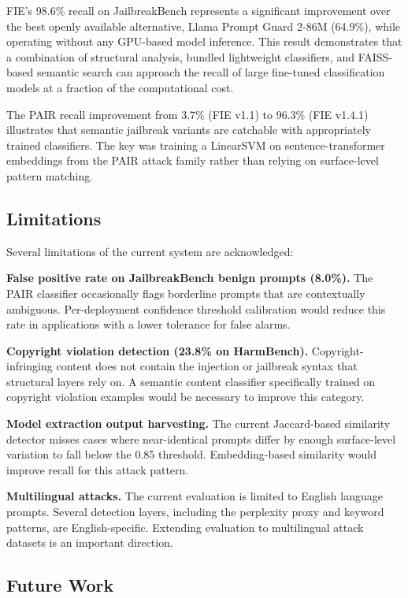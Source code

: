 \documentclass[preprint,12pt,authoryear]{elsarticle}
\begin{document}
FIE's 98.6\% recall on JailbreakBench represents a significant
improvement over the best openly available alternative, Llama Prompt
Guard 2-86M (64.9\%), while operating without any GPU-based model
inference. This result demonstrates that a combination of structural
analysis, bundled lightweight classifiers, and FAISS-based semantic
search can approach the recall of large fine-tuned classification
models at a fraction of the computational cost.

The PAIR recall improvement from 3.7\% (FIE v1.1) to 96.3\%
(FIE v1.4.1) illustrates that semantic jailbreak variants are
catchable with appropriately trained classifiers. The key was training
a LinearSVM on sentence-transformer embeddings from the PAIR attack
family rather than relying on surface-level pattern matching.

\subsection{Limitations}

Several limitations of the current system are acknowledged:

\textbf{False positive rate on JailbreakBench benign prompts (8.0\%).}
The PAIR classifier occasionally flags borderline prompts that are
contextually ambiguous. Per-deployment confidence threshold calibration
would reduce this rate in applications with a lower tolerance for
false alarms.

\textbf{Copyright violation detection (23.8\% on HarmBench).}
Copyright-infringing content does not contain the injection or
jailbreak syntax that structural layers rely on. A semantic content
classifier specifically trained on copyright violation examples would
be necessary to improve this category.

\textbf{Model extraction output harvesting.}
The current Jaccard-based similarity detector misses cases where
near-identical prompts differ by enough surface-level variation to
fall below the 0.85 threshold. Embedding-based similarity would
improve recall for this attack pattern.

\textbf{Multilingual attacks.}
The current evaluation is limited to English language prompts.
Several detection layers, including the perplexity proxy and keyword
patterns, are English-specific. Extending evaluation to multilingual
attack datasets is an important direction.

\subsection{Future Work}
\end{document}
